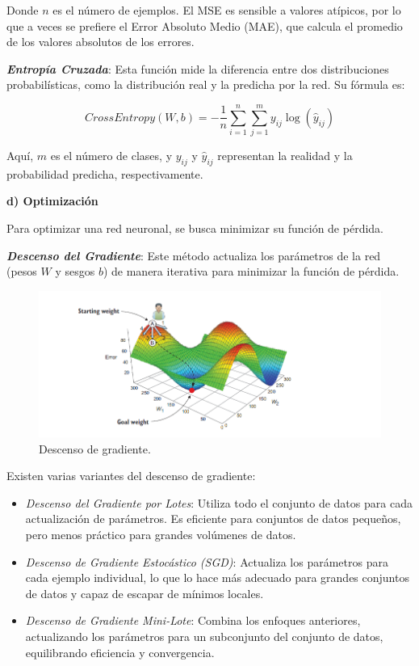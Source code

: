 Donde \(n\) es el número de ejemplos. El MSE es sensible a valores atípicos, por lo que a veces se prefiere el Error Absoluto Medio (MAE), que calcula el promedio de los valores absolutos de los errores.

\textbf{\textit{Entropía Cruzada}}: Esta función mide la diferencia entre dos distribuciones probabilísticas, como la distribución real y la predicha por la red. Su fórmula es:

\begin{equation}
    CrossEntropy(W, b) = -\frac{1}{n} \sum_{i=1}^{n} \sum_{j=1}^{m} y_{ij} \log(\hat{y}_{ij})
\end{equation}

Aquí, \(m\) es el número de clases, y \(y_{ij}\) y \(\hat{y}_{ij}\) representan la realidad y la probabilidad predicha, respectivamente.

\textbf{d) Optimización}

Para optimizar una red neuronal, se busca minimizar su función de pérdida.

\textbf{\textit{Descenso del Gradiente}}: Este método actualiza los parámetros de la red (pesos \(W\) y sesgos \(b\)) de manera iterativa para minimizar la función de pérdida.

\begin{figure}[H]
    \begin{center}
        \includegraphics[width=\textwidth]{Images/Gradiente.png}
    \end{center}
    \caption{Descenso de gradiente.}
    \label{fig:Gradiente}
\end{figure}

Existen varias variantes del descenso de gradiente:

\begin{itemize}
    \item \textit{Descenso del Gradiente por Lotes}: Utiliza todo el conjunto de datos para cada actualización de parámetros. Es eficiente para conjuntos de datos pequeños, pero menos práctico para grandes volúmenes de datos.
    \item \textit{Descenso de Gradiente Estocástico (SGD)}: Actualiza los parámetros para cada ejemplo individual, lo que lo hace más adecuado para grandes conjuntos de datos y capaz de escapar de mínimos locales.
    \item \textit{Descenso de Gradiente Mini-Lote}: Combina los enfoques anteriores, actualizando los parámetros para un subconjunto del conjunto de datos, equilibrando eficiencia y convergencia.
\end{itemize}

